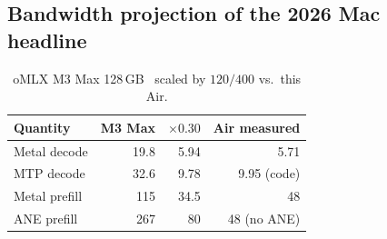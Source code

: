 \subsection{Bandwidth projection of the 2026 Mac headline}
\label{sec:mac200}

\begin{table}[t]
\centering
\caption{oMLX M3 Max 128\,GB~\citep{omlx2874} scaled by $120/400$ vs.\ this Air.}
\label{tab:scale}
\begin{tabular}{@{}lrrr@{}}
\toprule
Quantity & M3 Max & $\times 0.30$ & Air measured \\
\midrule
Metal decode & 19.8 & 5.94 & 5.71 \\
MTP decode & 32.6 & 9.78 & 9.95 (code) \\
Metal prefill & 115 & 34.5 & 48 \\
ANE prefill & 267 & 80 & 48 (no ANE) \\
\bottomrule
\end{tabular}
\end{table}

